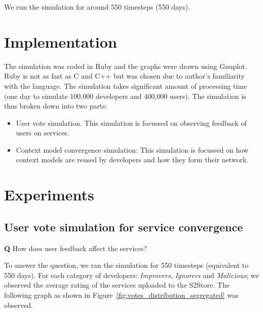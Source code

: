We run the simulation for around 550 timesteps (550 days).

\section{Implementation}

The simulation was coded in Ruby and the graphs were drawn using Gnuplot. Ruby is not as fast as C and C++ but was chosen due to author's familiarity with the language. The simulation takes significant amount of processing time (one day to simulate 100,000 developers and 400,000 users). The simulation is thus broken down into two parts:

\begin{itemize}
  \item User vote simulation. This simulation is focussed on observing feedback of users on services.
  \item Context model convergence simulation: This simulation is focussed on how context models are reused by developers and how they form their network.
\end{itemize}

\section{Experiments}
\label{sec:experiments}

\subsection{User vote simulation for service convergence}

\textbf{Q} How does user feedback affect the services?

To answer the question, we ran the simulation for 550 timesteps (equivalent to 550 days). For each category of developers: \emph{Improvers}, \emph{Ignorers} and \emph{Malicious}; we observed the average rating of the services uploaded to the S2Store. The following graph as shown in Figure~\ref{fig:votes_distribution_segregated} was observed.


